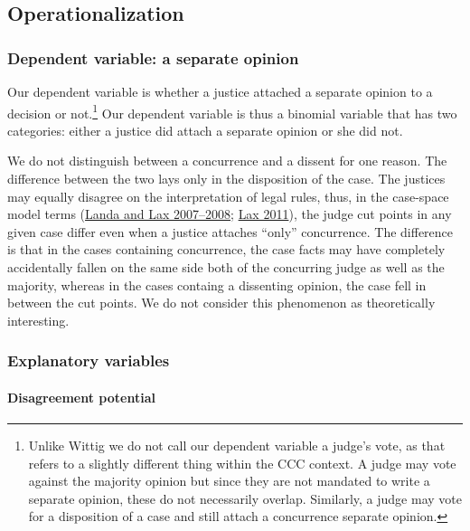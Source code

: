 \documentclass[
  11pt,
]{article}
\begin{document}
\hypertarget{operationalization}{%
\subsection{Operationalization}\label{operationalization}}

\hypertarget{dependent-variable-a-separate-opinion}{%
\subsubsection{Dependent variable: a separate
opinion}\label{dependent-variable-a-separate-opinion}}

Our dependent variable is whether a justice attached a separate opinion
to a decision or not.\footnote{Unlike Wittig we do not call our
  dependent variable a judge's vote, as that refers to a slightly
  different thing within the CCC context. A judge may vote against the
  majority opinion but since they are not mandated to write a separate
  opinion, these do not necessarily overlap. Similarly, a judge may vote
  for a disposition of a case and still attach a concurrence separate
  opinion.} Our dependent variable is thus a binomial variable that has
two categories: either a justice did attach a separate opinion or she
did not.

We do not distinguish between a concurrence and a dissent for one
reason. The difference between the two lays only in the disposition of
the case. The justices may equally disagree on the interpretation of
legal rules, thus, in the case-space model terms
(\protect\hyperlink{ref-landaDisagreementsCollegialCourts2007}{Landa and
Lax 2007--2008}; \protect\hyperlink{ref-laxNewJudicialPolitics2011}{Lax
2011}), the judge cut points in any given case differ even when a
justice attaches ``only'' concurrence. The difference is that in the
cases containing concurrence, the case facts may have completely
accidentally fallen on the same side both of the concurring judge as
well as the majority, whereas in the cases containg a dissenting
opinion, the case fell in between the cut points. We do not consider
this phenomenon as theoretically interesting.

\hypertarget{explanatory-variables}{%
\subsubsection{Explanatory variables}\label{explanatory-variables}}

\hypertarget{disagreement-potential}{%
\paragraph{Disagreement potential}\label{disagreement-potential}}
\end{document}

